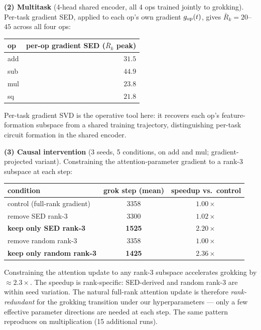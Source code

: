\documentclass[11pt]{article}
\begin{document}
\textbf{(2) Multitask} (4-head shared encoder, all 4 ops trained
jointly to grokking). Per-task gradient SED, applied to each
op's own gradient $g_{\rm op}(t)$, gives $\bar R_k = 20$--$45$
across all four ops:

\begin{center}\small
\begin{tabular}{lr}
\toprule
op  & per-op gradient SED ($\bar R_k$ peak) \\
\midrule
add & $\mathbf{31.5}$ \\
sub & $\mathbf{44.9}$ \\
mul & $\mathbf{23.8}$ \\
sq  & $\mathbf{21.8}$ \\
\bottomrule
\end{tabular}
\end{center}

Per-task gradient SVD is the operative tool here: it recovers
each op's feature-formation subspace from a shared training
trajectory, distinguishing per-task circuit formation in the
shared encoder.

\textbf{(3) Causal intervention} (3 seeds, 5 conditions, on add
and mul; gradient-projected variant). Constraining the
attention-parameter gradient to a rank-3 subspace at each step:

\begin{center}\small
\begin{tabular}{lcc}
\toprule
condition                                    & grok step (mean) & speedup vs.\ control \\
\midrule
control (full-rank gradient)                 & 3358 & $1.00\times$ \\
remove SED rank-3                            & 3300 & $1.02\times$ \\
\textbf{keep only SED rank-3}                & \textbf{1525} & $\mathbf{2.20\times}$ \\
remove random rank-3                         & 3358 & $1.00\times$ \\
\textbf{keep only random rank-3}             & \textbf{1425} & $\mathbf{2.36\times}$ \\
\bottomrule
\end{tabular}
\end{center}

Constraining the attention update to any rank-3 subspace
accelerates grokking by $\approx 2.3\times$. The speedup is
rank-specific: SED-derived and random rank-3 are within seed
variation. The natural full-rank attention update is therefore
\emph{rank-redundant} for the grokking transition under our
hyperparameters --- only a few effective parameter directions are
needed at each step. The same pattern reproduces on multiplication
(15 additional runs).
\end{document}
